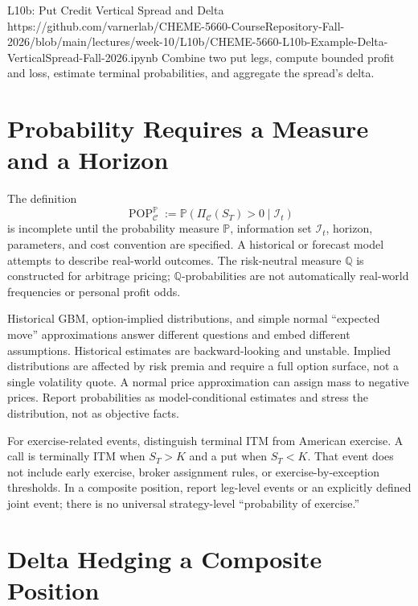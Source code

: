 \documentclass[11pt]{article}
\begin{document}
\notebooklink
  {L10b: Put Credit Vertical Spread and Delta}
  {https://github.com/varnerlab/CHEME-5660-CourseRepository-Fall-2026/blob/main/lectures/week-10/L10b/CHEME-5660-L10b-Example-Delta-VerticalSpread-Fall-2026.ipynb}
  {Combine two put legs, compute bounded profit and loss, estimate terminal probabilities, and aggregate the spread's delta.}

\section{Probability Requires a Measure and a Horizon}

The definition
\begin{equation}
  \label{eq:general-pop}
  \operatorname{POP}_{\mathcal C}^{\mathbb P}
  :=\mathbb P\!\left(\Pi_{\mathcal C}(S_T)>0\mid\mathcal I_t\right)
\end{equation}
is incomplete until the probability measure $\mathbb P$, information set $\mathcal I_t$, horizon, parameters, and cost convention are specified. A historical or forecast model attempts to describe real-world outcomes. The risk-neutral measure $\mathbb Q$ is constructed for arbitrage pricing; $\mathbb Q$-probabilities are not automatically real-world frequencies or personal profit odds.

Historical GBM, option-implied distributions, and simple normal ``expected move'' approximations answer different questions and embed different assumptions. Historical estimates are backward-looking and unstable. Implied distributions are affected by risk premia and require a full option surface, not a single volatility quote. A normal price approximation can assign mass to negative prices. Report probabilities as model-conditional estimates and stress the distribution, not as objective facts.

For exercise-related events, distinguish terminal ITM from American exercise. A call is terminally ITM when $S_T>K$ and a put when $S_T<K$. That event does not include early exercise, broker assignment rules, or exercise-by-exception thresholds. In a composite position, report leg-level events or an explicitly defined joint event; there is no universal strategy-level ``probability of exercise.''

\section{Delta Hedging a Composite Position}
\end{document}
